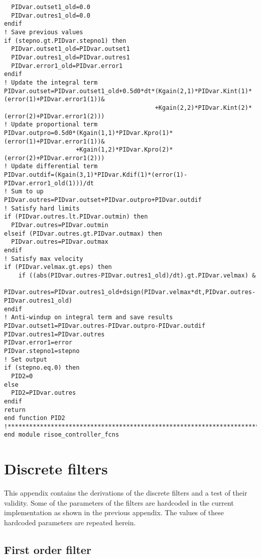 {\begin{verbatim}
  PIDvar.outset1_old=0.0
  PIDvar.outres1_old=0.0
endif
! Save previous values
if (stepno.gt.PIDvar.stepno1) then
  PIDvar.outset1_old=PIDvar.outset1
  PIDvar.outres1_old=PIDvar.outres1
  PIDvar.error1_old=PIDvar.error1
endif
! Update the integral term
PIDvar.outset=PIDvar.outset1_old+0.5d0*dt*(Kgain(2,1)*PIDvar.Kint(1)*(error(1)+PIDvar.error1(1))&
                                          +Kgain(2,2)*PIDvar.Kint(2)*(error(2)+PIDvar.error1(2)))
! Update proportional term
PIDvar.outpro=0.5d0*(Kgain(1,1)*PIDvar.Kpro(1)*(error(1)+PIDvar.error1(1))&
                    +Kgain(1,2)*PIDvar.Kpro(2)*(error(2)+PIDvar.error1(2)))
! Update differential term
PIDvar.outdif=(Kgain(3,1)*PIDvar.Kdif(1)*(error(1)-PIDvar.error1_old(1)))/dt
! Sum to up
PIDvar.outres=PIDvar.outset+PIDvar.outpro+PIDvar.outdif
! Satisfy hard limits
if (PIDvar.outres.lt.PIDvar.outmin) then
  PIDvar.outres=PIDvar.outmin
elseif (PIDvar.outres.gt.PIDvar.outmax) then
  PIDvar.outres=PIDvar.outmax
endif
! Satisfy max velocity
if (PIDvar.velmax.gt.eps) then
    if ((abs(PIDvar.outres-PIDvar.outres1_old)/dt).gt.PIDvar.velmax) &
      PIDvar.outres=PIDvar.outres1_old+dsign(PIDvar.velmax*dt,PIDvar.outres-PIDvar.outres1_old)
endif
! Anti-windup on integral term and save results
PIDvar.outset1=PIDvar.outres-PIDvar.outpro-PIDvar.outdif
PIDvar.outres1=PIDvar.outres
PIDvar.error1=error
PIDvar.stepno1=stepno
! Set output
if (stepno.eq.0) then
  PID2=0
else
  PID2=PIDvar.outres
endif
return
end function PID2
!**************************************************************************************************
end module risoe_controller_fcns
\end{verbatim}
}

\pagebreak
\chapter{Discrete filters} \label{ch:filters}

This appendix contains the derivations of the discrete filters and a test of their validity. Some of the parameters of the filters are hardcoded in the current implementation as shown in the previous appendix. The values of these hardcoded parameters are repeated herein.

\section{First order filter}

